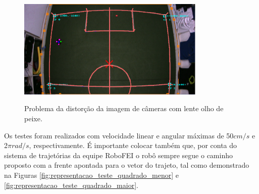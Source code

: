 \documentclass[acronym, symbols, table]{fei}
\begin{document}
		\begin{figure}[!htb]
			\centering
			\caption{Problema da distorção da imagem de câmeras com lente olho de peixe.}
			\includegraphics[width=0.80\textwidth]{problema_distorcao_2.png}
			\label{fig:problema_distorcao}
		\end{figure}
	
		Os testes foram realizados com velocidade linear e angular máximas de 50$cm/s$ e 2$\pi$$rad/s$, respectivamente. É importante colocar também que, por conta do sistema de trajetórias da equipe RoboFEI o robô sempre segue o caminho proposto com a frente apontada para o vetor do trajeto, tal como demonstrado na Figuras \ref{fig:representacao_teste_quadrado_menor} e \ref{fig:representacao_teste_quadrado_maior}.
		
\end{document}
